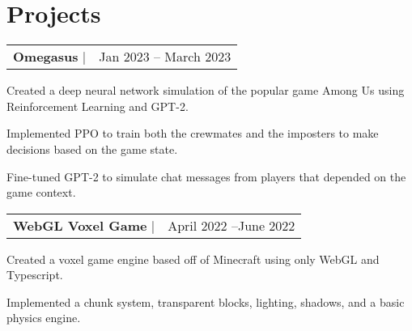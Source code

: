 \documentclass[letterpaper,11pt]{article}
\makeatletter
\newcommand{\resumeSubheadingShort}[3]{
  \begin{tabular*}{0.97\textwidth}[t]{l@{\extracolsep{\fill}}r}
    \textbf{#1} $\vert$ \raisebox{1pt}{\small{#2}} & #3 \\
  \end{tabular*}
}
\newenvironment{resumeSubheadingList}
{\begin{itemize}[leftmargin=0.1in, label={}, noitemsep, topsep=0pt]}
{\end{itemize}}
\newenvironment{resumeListBulleted}[1][0.17in]
{\begin{itemize}[leftmargin=#1, noitemsep, topsep=0pt]\begin{small}}
{\end{small}\end{itemize}}
\newcommand{\link}[2]{\color{blue}{\href{#1}{\underline{#2}}}}
\makeatother
\begin{document}
\section{Projects}
\begin{resumeSubheadingList}
  \item
    \resumeSubheadingShort
    {Omegasus} {\link{https://github.com/pimpale/omegasus}{github.com/pimpale/omegasus}} {Jan 2023 -- March 2023}
    \begin{resumeListBulleted}
      \item Created a deep neural network simulation of the popular game Among Us using Reinforcement Learning and GPT-2.
      \item Implemented PPO to train both the crewmates and the imposters to make decisions based on the game state. 
      \item Fine-tuned GPT-2 to simulate chat messages from players that depended on the game context.
    \end{resumeListBulleted}
  \item
    \resumeSubheadingShort
    {WebGL Voxel Game} {\link{https://github.com/pimpale/webgl-voxel-game}{github.com/pimpale/webgl-voxel-game}} {April 2022 --June 2022}
    \begin{resumeListBulleted}
      \item Created a voxel game engine based off of Minecraft using only WebGL and Typescript. 
      \item Implemented a chunk system, transparent blocks, lighting, shadows, and a basic physics engine.
    \end{resumeListBulleted}
\end{resumeSubheadingList}


\end{document}
